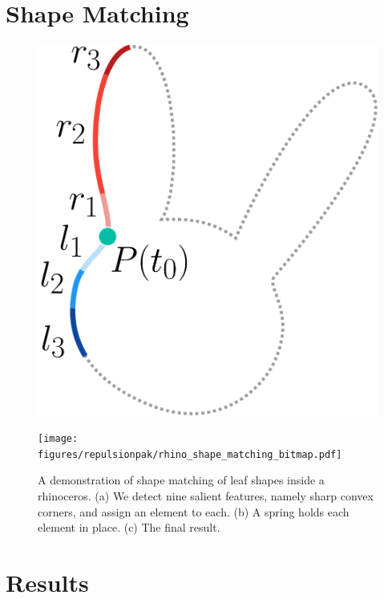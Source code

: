 \section{Shape Matching}
\label{shape_matching}



\begin{figure}[t]
\centering
\includegraphics[width=0.3\columnwidth]{figures/repulsionpak/descriptor_2.pdf}
\caption[A local shape descriptor for shape matching]
{\label{fig_shape_matching}
}
\end{figure}
\begin{figure}
\centering
\texttt{[image: figures/repulsionpak/rhino\_shape\_matching\_bitmap.pdf]} 
\caption[A demonstration of shape matching of leaf shapes inside a rhinoceros]
{\label{rhino_packing}
{ 
A demonstration of shape matching of leaf shapes inside a rhinoceros. 
(a) We detect nine salient features, namely sharp convex corners, and 
assign an element to each.
(b) A spring holds each element in place.
(c) The final result.
}
}
\end{figure}

\section{Results}

